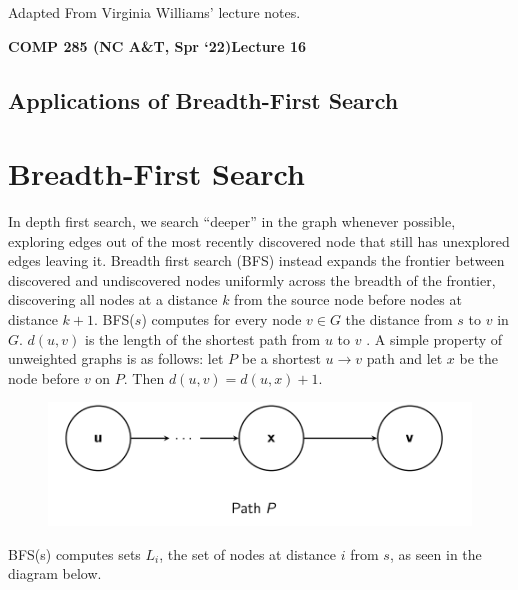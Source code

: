 \documentclass [12pt]{article}
\begin{document}
 

\vspace {1em} 
\begin {Instruction} 
Adapted From Virginia Williams' lecture notes.
\end {Instruction}  

{\LARGE \textbf {COMP 285 (NC A\&T, Spr `22)}\hfill \textbf {Lecture 16} } 

\begin{centering}
\section*{Applications of Breadth-First Search}
\end{centering}
 
 \section{Breadth-First Search}
 In depth first search, we search ``deeper'' in the graph whenever possible, exploring edges out of the most recently discovered node that still has unexplored edges leaving it. Breadth first search (BFS) instead expands the frontier between discovered and undiscovered nodes uniformly across the breadth of the frontier, discovering all nodes at a distance $k$ from the source node before nodes at distance $k + 1$. BFS($s$) computes for every node $v \in G$ the distance from $s$ to $v$ in $G$. $d(u, v )$ is the length of the shortest path from $u$ to $v$ . A simple property of unweighted graphs is as follows: let $P$ be a shortest $u \to v$ path and let $x$ be the node before $v$ on $P$. Then $d(u, v) = d(u, x) + 1$.

\begin{figure}[h!]
\centering
\includegraphics[scale=0.5]{bfs_path.png}
\end{figure}

BFS(s) computes sets $L_i$, the set of nodes at distance $i$ from $s$, as seen in the diagram below.
\end{document}
